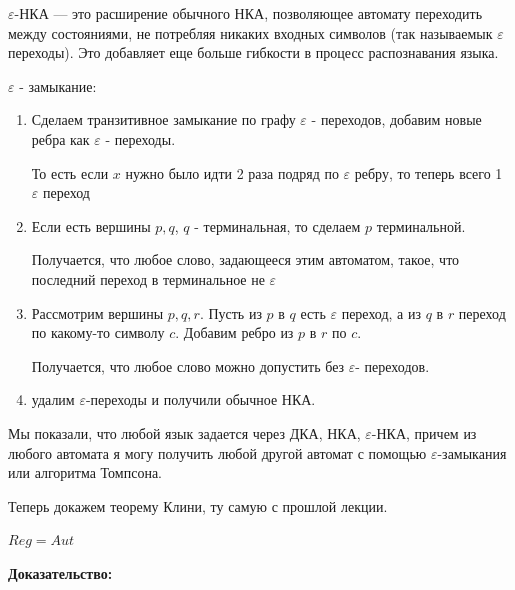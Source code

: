 $\varepsilon$-НКА  --- это расширение обычного НКА, позволяющее автомату переходить между состояниями, не потребляя никаких входных символов (так называемык $\varepsilon$ переходы). Это добавляет еще больше гибкости в процесс распознавания языка.

$\varepsilon$ - замыкание:

\begin{enumerate}
    \item  Сделаем транзитивное замыкание по графу $\varepsilon$ - переходов, добавим новые ребра как $\varepsilon$ - переходы.
    
     То есть если $x$ нужно было идти 2 раза подряд по $\varepsilon$ ребру, то теперь всего 1 $\varepsilon$ переход
     \item  Если есть вершины $p,q$, $q$ - терминальная, то сделаем $p$ терминальной. 
     
     Получается, что любое слово, задающееся этим автоматом, такое, что последний переход в терминальное не $\varepsilon$
     \item Рассмотрим вершины $p,q,r$. Пусть из $p$ в $q$ есть $\varepsilon$ переход, а из $q$ в $r$ переход по какому-то символу $c$. Добавим ребро из $p$ в $r$ по $c$. 

     Получается, что любое слово можно допустить без $\varepsilon$- переходов.
     \item удалим $\varepsilon$-переходы и получили обычное НКА.
\end{enumerate}

Мы показали, что любой язык задается через ДКА, НКА, $\varepsilon$-НКА, причем из любого автомата я могу получить любой другой автомат с помощью $\varepsilon$-замыкания или алгоритма Томпсона.


Теперь докажем теорему Клини, ту самую с прошлой лекции. 


$Reg = Aut$

\textbf{Доказательство:}

